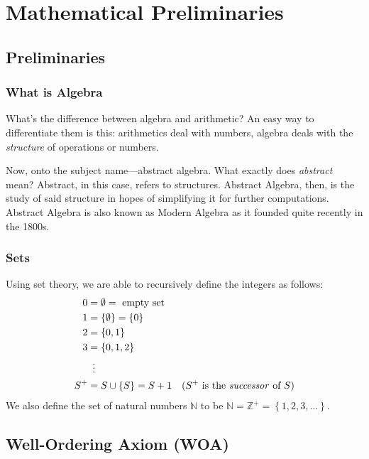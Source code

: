 \chapter{Mathematical Preliminaries}

\section{Preliminaries}

\subsection{What is Algebra}

What's the difference between algebra and arithmetic? An easy way to differentiate them is this: arithmetics deal with numbers, algebra deals with the \textit{structure} of operations or numbers.

Now, onto the subject name---abstract algebra. What exactly does \textit{abstract} mean? Abstract, in this case, refers to structures. Abstract Algebra, then, is the study of said structure in hopes of simplifying it for further computations. Abstract Algebra is also known as Modern Algebra as it founded quite recently in the 1800s.

\subsection{Sets}

Using set theory, we are able to recursively define the integers as follows:
\[
\begin{aligned}
    0 &= \emptyset = \text{ empty set} \\
    1 &= \left\{\emptyset\right\} = \left\{0\right\} \\
    2 &= \left\{0, 1\right\} \\
    3 &= \left\{0, 1, 2\right\} \\
      &\phantom{0}\vdots \\
    S^+ &= S \cup \left\{S\right\} = S+1 &\text{(\(S^+\) is the \textit{successor} of \(S\))}
\end{aligned}
\]
We also define the set of natural numbers \(\mathbb{N}\) to be \( \mathbb{N} = \mathbb{Z}^+ = \left\{1, 2, 3, \ldots\right\}\).

\section{Well-Ordering Axiom (WOA)}

